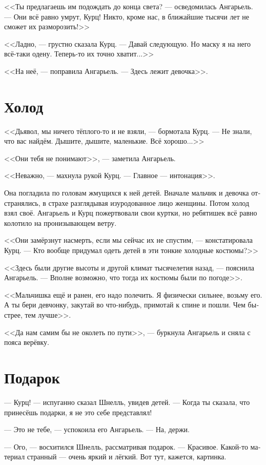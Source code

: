 \documentclass[a4paper,12pt,fleqn]{book}\usepackage{cooltooltips}\usepackage{polyglossia}\setdefaultlanguage[babelshorthands=true]{russian}\setotherlanguage{english}\defaultfontfeatures{Ligatures=TeX,Mapping=tex-text} \usepackage{xcolor}\definecolor{lightgray}{HTML}{bbbbbb}\color{lightgray}\newcommand{\ml}[3]{\textenglish{\textcolor{black}{#3}}}
\begin{document}
<<Ты предлагаешь им подождать до конца света? --- осведомилась Ангарьель.
--- Они всё равно умрут, Курц!
Никто, кроме нас, в ближайшие тысячи лет не сможет их разморозить!>>

<<Ладно, --- грустно сказала Курц.
--- Давай следующую.
Но маску я на него всё-таки одену.
Теперь-то их точно хватит...>>

<<На неё, --- поправила Ангарьель.
--- Здесь лежит девочка>>.

\section{Холод}

<<Дьявол, мы ничего тёплого-то и не взяли, --- бормотала Курц.
--- Не знали, что вас найдём.
Дышите, дышите, маленькие.
Всё хорошо...>>

<<Они тебя не понимают>>, --- заметила Ангарьель.

<<Неважно, --- махнула рукой Курц.
--- Главное --- интонация>>.

Она погладила по головам жмущихся к ней детей.
Вначале мальчик и девочка отстранялись, в страхе разглядывая изуродованное лицо женщины.
Потом холод взял своё.
Ангарьель и Курц пожертвовали свои куртки, но ребятишек всё равно колотило на пронизывающем ветру.

<<Они замёрзнут насмерть, если мы сейчас их не спустим, --- констатировала Курц.
--- Кто вообще придумал одеть детей в эти тонкие холодные костюмы?>>

<<Здесь были другие высоты и другой климат тысячелетия назад, --- пояснила Ангарьель.
--- Вполне возможно, что тогда их костюмы были по погоде>>.

<<Мальчишка ещё и ранен, его надо полечить.
Я физически сильнее, возьму его.
А ты бери девчонку, закутай во что-нибудь, примотай к спине и пошли.
Чем быстрее, тем лучше>>.

<<Да нам самим бы не околеть по пути>>, --- буркнула Ангарьель и сняла с пояса верёвку.

\section{Подарок}

--- Курц! --- испуганно сказал Шнелль, увидев детей.
--- Когда ты сказала, что принесёшь подарки, я не это себе представлял!

--- Это не тебе, --- успокоила его Ангарьель.
--- На, держи.

--- Ого, --- восхитился Шнелль, рассматривая подарок.
--- Красивое.
Какой-то материал странный --- очень яркий и лёгкий.
Вот тут, кажется, картинка.
\end{document}
